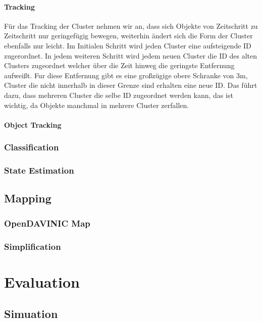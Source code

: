 \documentclass[11pt,oneside,openright]{mpreport}
\begin{document}
\subsubsection{Tracking}
Für das Tracking der Cluster nehmen wir an, dass sich Objekte von Zeitschritt zu Zeitschritt nur geringefügig bewegen, weiterhin
ändert sich die Form der Cluster ebenfalls nur leicht. Im Initialen Schritt wird jeden Cluster eine aufsteigende ID zugerordnet.
In jedem weiteren Schritt wird jedem neuen Cluster die ID des alten Clusters zugeordnet welcher über die Zeit hinweg die geringste Entfernung aufweißt.
Fur diese Entfernung gibt es eine großzügige obere Schranke von 3m, Cluster die nicht innerhalb in dieser Grenze sind erhalten eine neue ID.
Das führt dazu, dass mehreren Cluster die selbe ID zugeordnet werden kann, das ist wichtig, da Objekte manchmal in mehrere Cluster zerfallen.

\subsubsection{Object Tracking}


\subsection{Classification}

\subsection{State Estimation}


\section{Mapping}
\subsection{OpenDAVINIC Map}
\subsection{Simplification}




\chapter{Evaluation}

\section{Simuation}
\end{document}

